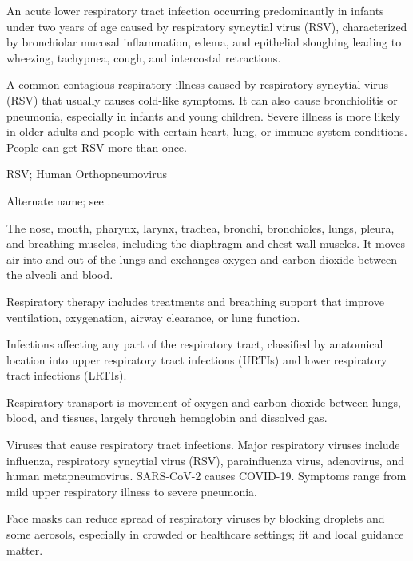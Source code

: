  An acute lower respiratory tract infection occurring predominantly in infants under two years of age caused by respiratory syncytial virus (RSV), characterized by bronchiolar mucosal inflammation, edema, and epithelial sloughing leading to wheezing, tachypnea, cough, and intercostal retractions.

 A common contagious respiratory illness caused by respiratory syncytial virus (RSV) that usually causes cold-like symptoms. It can also cause bronchiolitis or pneumonia, especially in infants and young children. Severe illness is more likely in older adults and people with certain heart, lung, or immune-system conditions. People can get RSV more than once.

\synonyms
RSV; Human Orthopneumovirus

 Alternate name; see .

 The nose, mouth, pharynx, larynx, trachea, bronchi, bronchioles, lungs, pleura, and breathing muscles, including the diaphragm and chest-wall muscles. It moves air into and out of the lungs and exchanges oxygen and carbon dioxide between the alveoli and blood.

 Respiratory therapy includes treatments and breathing support that improve ventilation, oxygenation, airway clearance, or lung function.

 Infections affecting any part of the respiratory tract, classified by anatomical
location into upper respiratory tract infections (URTIs) and lower respiratory tract
infections (LRTIs).

 Respiratory transport is movement of oxygen and carbon dioxide between lungs, blood, and tissues, largely through hemoglobin and dissolved gas.

 Viruses that cause respiratory tract infections. Major respiratory viruses include
influenza, respiratory syncytial virus (RSV), parainfluenza virus, adenovirus, and human
metapneumovirus. SARS-CoV-2 causes COVID-19. Symptoms range from mild upper respiratory
illness to severe pneumonia.

 Face masks can reduce spread of respiratory viruses by blocking droplets and some aerosols, especially in crowded or healthcare settings; fit and local guidance matter.

